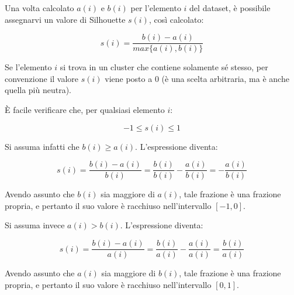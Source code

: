 \documentclass[italian]{article}
\begin{document}
			Una volta calcolato $a(i)$ e $b(i)$ per l'elemento $i$ del dataset, è
			possibile assegnarvi un valore di Silhouette $s(i)$, così calcolato:

			\begin{equation}
				s(i) = \frac{b(i) - a(i)}{max\{a(i), b(i)\}}
			\end{equation}

			Se l'elemento $i$ si trova in un cluster che contiene solamente sé stesso,
			per convenzione il valore $s(i)$ viene posto a $0$ (è una scelta arbitraria,
			ma è anche quella più neutra).

			È facile verificare che, per qualsiasi elemento $i$:

			\begin{equation*}
				-1 \leq s(i) \leq 1
			\end{equation*}

			Si assuma infatti che $b(i) \geq a(i)$. L'espressione diventa:

			\begin{equation*}
				s(i) = \frac{b(i) - a(i)}{b(i)} =
				\frac{b(i)}{b(i)} - \frac{a(i)}{b(i)} =
				- \frac{a(i)}{b(i)}
			\end{equation*}

			Avendo assunto che $b(i)$ sia maggiore di $a(i)$, tale frazione è una
			frazione propria, e pertanto il suo valore è racchiuso nell'intervallo
			$[-1, 0]$.

			Si assuma invece $a(i) > b(i)$. L'espressione diventa:

			\begin{equation*}
				s(i) = \frac{b(i) - a(i)}{a(i)} =
				\frac{b(i)}{a(i)} - \frac{a(i)}{a(i)} =
				\frac{b(i)}{a(i)}
			\end{equation*}

			Avendo assunto che $a(i)$ sia maggiore di $b(i)$, tale frazione è una
			frazione propria, e pertanto il suo valore è racchiuso nell'intervallo
			$[0, 1]$.

\end{document}
